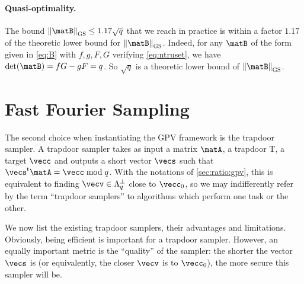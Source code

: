 

\paragraph{Quasi-optimality.}
The bound $\gsnorm{\matB} \leq 1.17 \sqrt{q}$ that we reach in practice is within a factor $1.17$ of the theoretic lower bound for $\gsnorm{\matB}$. Indeed, for any $\matB$ of the form given in \eqref{eq:B} with $f,g,F,G$ verifying \eqref{eq:ntruset}, we have $\det(\matB) = f G - g F = q$. So $\sqrt{q}$ is a theoretic lower bound of $\gsnorm{\matB}$.

\section{Fast Fourier Sampling}\label{sec:ratio:ffs}

The second choice when instantiating the GPV framework is the trapdoor sampler. A trapdoor sampler takes as input a matrix $\matA$, a trapdoor \textsf{T}, a target $\vecc$ and outputs a short vector $\vecs$ such that $\vecs^\t \matA = \vecc \bmod q$. With the notations of \cref{sec:ratio:gpv}, this is equivalent to finding $\vecv \in \Lambda_q^\perp$ close to $\vecc_0$, so we may indifferently refer by the term ``trapdoor samplers'' to algorithms which perform one task or the other.

We now list the existing trapdoor samplers, their advantages and limitations. Obviously, being efficient is important for a trapdoor sampler. However, an equally important metric is the ``quality'' of the sampler: the shorter the vector $\vecs$ is (or equivalently, the closer $\vecv$ is to $\vecc_0$), the more secure this sampler will be.

